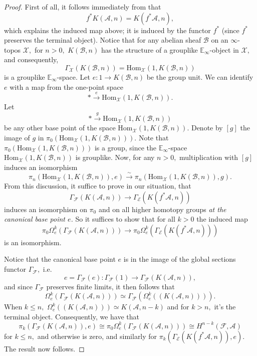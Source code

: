 \documentclass[12pt]{amsart}
\theoremstyle{definition}
\newcommand{\cA}{\mathcal{A}}
\newcommand{\cB}{\mathcal{B}}
\newcommand{\cE}{\mathcal{E}}
\newcommand{\cF}{\mathcal{F}}
\newcommand{\cX}{\mathcal{X}}
\newcommand{\Hom}{\mathrm{Hom}}
\renewcommand{\i}{\infty}
\begin{document}
\begin{proof}
First of all, it follows immediately from \cite[Remark 6.5.1.4]{htt} that $$f^*K\left(\cA,n\right)=K\left(f^*\cA,n\right),$$ which explains the induced map above; it is induced by the functor $f^*$ (since $f^*$ preserves the terminal object). Notice that for any abelian sheaf $\cB$ on an $\i$-topos $\cX,$ for $n>0,$ $K\left(\cB,n\right)$ has the structure of a grouplike $\mathbb{E}_\i$-object in $\cX,$ and consequently, $$\Gamma_{\cX}\left(K\left(\cB,n\right)\right)=\Hom_{\cX}\left(1,K\left(\cB,n\right)\right)$$ is a grouplike $\mathbb{E}_\i$-space. Let $e:1 \to K\left(\cB,n\right)$ be the group unit. We can identify $e$ with a map from the one-point space
$$* \stackrel{e}{\longrightarrow} \Hom_{\cX}\left(1,K\left(\cB,n\right)\right).$$ Let $$*\stackrel{g}{\longrightarrow} \Hom_{\cX}\left(1,K\left(\cB,n\right)\right)$$ be any other base point of the space $\Hom_{\cX}\left(1,K\left(\cB,n\right)\right).$ Denote by $\left[g\right]$ the image of $g$ in $\pi_0\left( \Hom_{\cX}\left(1,K\left(\cB,n\right)\right)\right).$ Note that $\pi_0\left( \Hom_{\cX}\left(1,K\left(\cB,n\right)\right)\right)$ is a group, since the $\mathbb{E}_\i$-space $\Hom_{\cX}\left(1,K\left(\cB,n\right)\right)$ is grouplike. Now, for any $n >0,$ multiplication with $\left[g\right]$ induces an isomorphism $$\pi_n\left(\Hom_{\cX}\left(1,K\left(\cB,n\right)\right),e\right) \stackrel{\sim}{\longrightarrow} \pi_n\left(\Hom_{\cX}\left(1,K\left(\cB,n\right)\right),g\right).$$ From this discussion, it suffice to prove in our situation, that $$\Gamma_{\cF}\left(K\left(\cA,n\right)\right) \to \Gamma_{\cE}\left(K\left(f^*\cA,n\right)\right)$$ induces an isomorphism on $\pi_0$ and on all higher homotopy groups \emph{at the canonical base point $e$.} So it suffices to show that for all $k>0$ the induced map
$$\pi_0\Omega^k_{e}\left(\Gamma_{\cF}\left(K\left(\cA,n\right)\right)\right) \to \pi_0\Omega^k_{e}\left(\Gamma_{\cE}\left(K\left(f^*\cA,n\right)\right)\right)$$ is an isomorphism.

Notice that the canonical base point $e$ is in the image of the global sections functor $\Gamma_{\cF},$ i.e.
$$e=\Gamma_{\cF}\left(e\right):\Gamma_{\cF}\left(1\right) \to \Gamma_{\cF}\left(K\left(\cA,n\right)\right),$$ and since $\Gamma_{\cF}$ preserves finite limits, it then follows that $$\Omega^k_{e}\left(\Gamma_{\cF}\left(K\left(\cA,n\right)\right)\right)\simeq \Gamma_{\cF}\left(\Omega^k_{e}\left(\left(K\left(\cA,n\right)\right)\right)\right).$$ When $k \le n,$ $\Omega^k_{e}\left(\left(K\left(\cA,n\right)\right)\right)\simeq K\left(\cA,n-k\right)$ and for $k>n,$ it's the terminal object. Consequently, we have that
$$\pi_k\left(\Gamma_{\cF}\left(K\left(\cA,n\right)\right),e\right) \cong \pi_0\Omega^k_{e}\left(\Gamma_{\cF}\left(K\left(\cA,n\right)\right)\right) \cong H^{n-k}\left(\cF,\cA\right)$$ for $k \le n,$ and otherwise is zero, and similarly for $\pi_k\left(\Gamma_{\cE}\left(K\left(f^*\cA,n\right)\right),e\right).$ The result now follows.
\end{proof}
\end{document}
